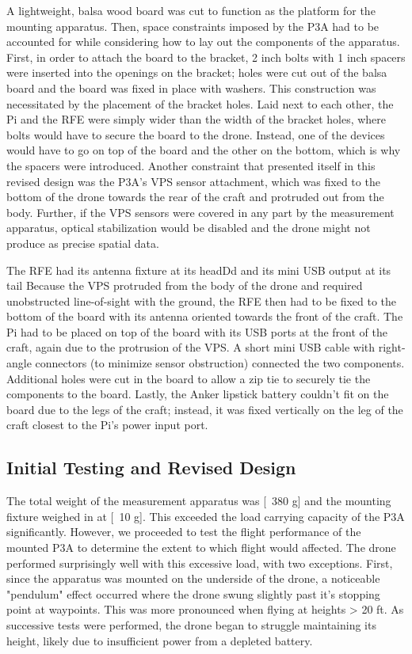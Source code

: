\documentclass[pageno]{jpaper}
\begin{document}
 
 A lightweight, balsa wood board was cut to function as the platform for the mounting apparatus. Then, space constraints imposed by the P3A had to be accounted for while considering how to lay out the components of the apparatus. First, in order to attach the board to the bracket, 2 inch bolts with 1 inch spacers were inserted into the openings on the bracket; holes were cut out of the balsa board and the board was fixed in place with washers. This construction was necessitated by the placement of the bracket holes. Laid next to each other, the Pi and the RFE were simply wider than the width of the bracket holes, where bolts would have to secure the board to the drone. Instead, one of the devices would have to go on top of the board and the other on the bottom, which is why the spacers were introduced. Another constraint that presented itself in this revised design was the P3A's VPS sensor attachment, which was fixed to the bottom of the drone towards the rear of the craft and protruded out from the body. Further, if the VPS sensors were covered in any part by the measurement apparatus, optical stabilization would be disabled and the drone might not produce as precise spatial data. 
 
 The RFE had its antenna fixture at its headDd and its mini USB output at its tail  Because the VPS protruded from the body of the drone and required unobstructed line-of-sight with the ground, the RFE then had to be fixed to the bottom of the board with its antenna oriented towards the front of the craft. The Pi had to be placed on top of the board with its USB ports at the front of the craft, again due to the protrusion of the VPS. A short mini USB cable with right-angle connectors (to minimize sensor obstruction) connected the two components. Additional holes were cut in the board to allow a zip tie to securely tie the components to the board. Lastly, the Anker lipstick battery couldn't fit on the board due to the legs of the craft; instead, it was fixed vertically on the leg of the craft closest to the Pi's power input port.
 
 \subsection{Initial Testing and Revised Design}
 The total weight of the measurement apparatus was [~380 g] and the mounting fixture weighed in at [~10 g]. This exceeded the load carrying capacity of the P3A significantly. However, we proceeded to test the flight performance of the mounted P3A to determine the extent to which flight would affected. The drone performed surprisingly well with  this excessive load, with two exceptions. First, since the apparatus was mounted on the underside of the drone, a noticeable "pendulum" effect occurred where the drone swung slightly past it's stopping point at waypoints. This was more pronounced when flying at heights > 20 ft. As successive tests were performed, the drone began to struggle maintaining its height, likely due to insufficient power from a depleted battery. 
 
\end{document}
